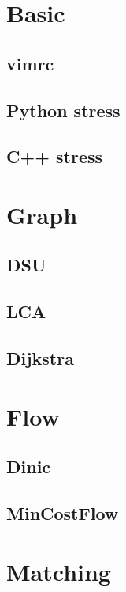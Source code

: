 \section{Basic}
	\subsection{vimrc}
			
	\subsection{Python stress}
				
	
	\subsection{C++ stress}
				
\newpage			
\section{Graph}
	\subsection{DSU}
		
	\subsection{LCA}
		
	\subsection{Dijkstra}
		

\section{Flow}
	\subsection{Dinic}
		
	\subsection{MinCostFlow}
		
		
\section{Matching}

